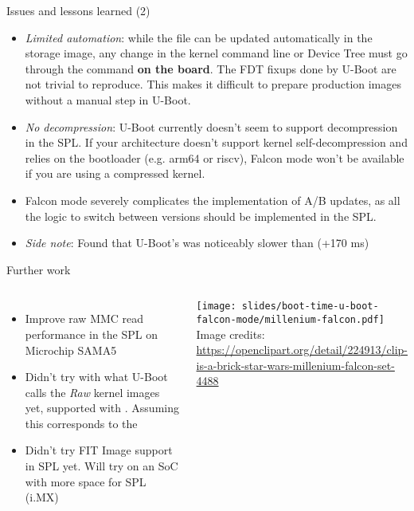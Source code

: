 \begin{frame}{Issues and lessons learned (2)}
   \begin{itemize}
      \item {\em Limited automation}: while the  file can be updated
            automatically in the storage image, any change in the kernel
            command line or Device Tree must go through the  command
            {\bf on the board}. The FDT fixups done by U-Boot are not trivial to
            reproduce. This makes it difficult to prepare production images without a
            manual step in U-Boot.
      \item {\em No decompression}: U-Boot currently doesn't seem to
            support decompression in the SPL. If your architecture
            doesn't support kernel self-decompression and relies on the bootloader
            (e.g. arm64 or riscv), Falcon mode won't be available if you are using
            a compressed kernel.
      \item Falcon mode severely complicates the implementation of A/B updates,
            as all the logic to switch between versions should be implemented
            in the SPL.
      \item {\em Side note}: Found that U-Boot's  was
            noticeably slower than  (+170 ms)
   \end{itemize}
\end{frame}

\begin{frame}{Further work}
   \begin{columns}
   \begin{itemize}
      \item Improve raw MMC read performance in the SPL on Microchip SAMA5
      \item Didn't try with what U-Boot calls the {\em Raw} kernel
            images yet, supported with .
            Assuming this corresponds to the 
      \item Didn't try FIT Image support in SPL yet. Will try on an SoC
            with more space for SPL (i.MX)
   \end{itemize}
    \begin{center}
     \vspace{1cm}
     \texttt{[image: slides/boot-time-u-boot-falcon-mode/millenium-falcon.pdf]}\\
     \vspace{1cm}
     \tiny Image credits:\\
     \url{https://openclipart.org/detail/224913/clip-is-a-brick-star-wars-millenium-falcon-set-4488}
    \end{center}
   \end{columns}
\end{frame}

